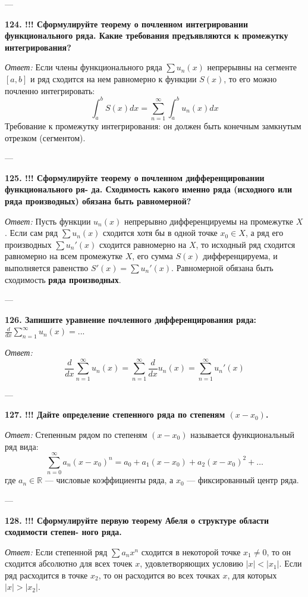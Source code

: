 \documentclass{article}
\begin{document}
---

\textbf{124. !!! Сформулируйте теорему о почленном интегрировании функционального ряда. Какие требования предъявляются к промежутку интегрирования?}

\textit{Ответ:} Если члены функционального ряда $\sum u_n(x)$ непрерывны на сегменте $[a, b]$ и ряд сходится на нем равномерно к функции $S(x)$, то его можно почленно интегрировать:
$$ \int_a^b S(x) dx = \sum_{n=1}^{\infty} \int_a^b u_n(x) dx $$
Требование к промежутку интегрирования: он должен быть конечным замкнутым отрезком (сегментом).

---

\textbf{125. !!! Сформулируйте теорему о почленном дифференцировании функционального ря- да. Сходимость какого именно ряда (исходного или ряда производных) обязана быть равномерной?}

\textit{Ответ:} Пусть функции $u_n(x)$ непрерывно дифференцируемы на промежутке $X$. Если сам ряд $\sum u_n(x)$ сходится хотя бы в одной точке $x_0 \in X$, а ряд его производных $\sum u_n'(x)$ сходится равномерно на $X$, то исходный ряд сходится равномерно на всем промежутке $X$, его сумма $S(x)$ дифференцируема, и выполняется равенство $S'(x) = \sum u_n'(x)$. Равномерной обязана быть сходимость \textbf{ряда производных}.

---

\textbf{126. Запишите уравнение почленного дифференцирования ряда: $\frac{d}{dx}\sum_{n=1}^{\infty}u_{n}(x)=...$}

\textit{Ответ:}
$$ \frac{d}{dx}\sum_{n=1}^{\infty} u_n(x) = \sum_{n=1}^{\infty} \frac{d}{dx} u_n(x) = \sum_{n=1}^{\infty} u_n'(x) $$

---

\textbf{127. !!! Дайте определение степенного ряда по степеням $(x-x_{0})$.}

\textit{Ответ:} Степенным рядом по степеням $(x-x_0)$ называется функциональный ряд вида:
$$ \sum_{n=0}^{\infty} a_n (x - x_0)^n = a_0 + a_1(x-x_0) + a_2(x-x_0)^2 + \dots $$
где $a_n \in \mathbb{R}$ — числовые коэффициенты ряда, а $x_0$ — фиксированный центр ряда.

---

\textbf{128. !!! Сформулируйте первую теорему Абеля о структуре области сходимости степен- ного ряда.}

\textit{Ответ:} Если степенной ряд $\sum a_n x^n$ сходится в некоторой точке $x_1 \neq 0$, то он сходится абсолютно для всех точек $x$, удовлетворяющих условию $|x| < |x_1|$. Если ряд расходится в точке $x_2$, то он расходится во всех точках $x$, для которых $|x| > |x_2|$.
\end{document}
